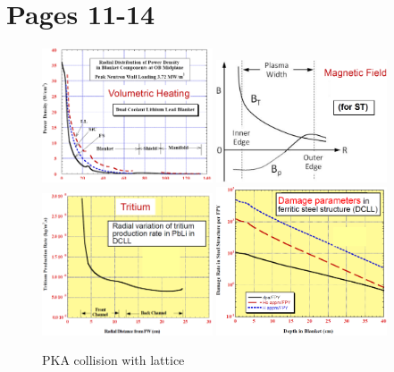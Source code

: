 \documentclass[11pt]{report} %
\begin{document}
\newpage
\section{Pages 11-14}

\begin{figure}[h!]
  \includegraphics[width=0.45\textwidth]{figs/PowerDensity.png}
  \label{fig:PowerDensity}
  \includegraphics[width=0.45\textwidth]{figs/Bfield.png}
  \label{fig:Bfield}
  \includegraphics[width=0.45\textwidth]{figs/tritiumProduction.png}
  \label{fig:tritiumProduction}
  \includegraphics[width=0.45\textwidth]{figs/damageParameters.png}
  \label{fig:damageParameters}
  \caption{PKA collision with lattice}
\end{figure}
\end{document}
